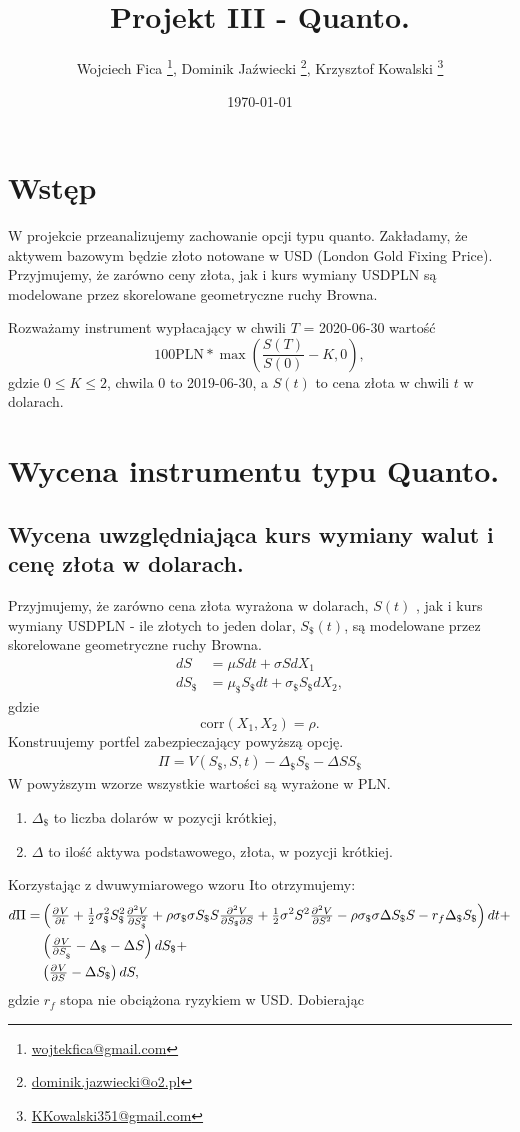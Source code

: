 \documentclass[12pt]{article}
\title{Projekt III - Quanto.}
\author{Wojciech Fica \footnote{\href{mailto:wojtekfica@gmail.com}{wojtekfica@gmail.com}}, Dominik Jaźwiecki \footnote{\href{mailto:dominik.jazwiecki@o2.pl}{dominik.jazwiecki@o2.pl}}, Krzysztof Kowalski \footnote{\href{mailto:KKowalski351@gmail.com}{KKowalski351@gmail.com}}}
\date{\today}
\newcommand{\corr}{\mathrm{corr}}
\providecommand{\pd}[3][]{\ensuremath{
\ifinner
\tfrac{\partial{^{#1}}#2}{\partial{#3^{#1}}}
\else
\dfrac{\partial{^{#1}}#2}{\partial{#3^{#1}}}
\fi
}}
\begin{document}
\maketitle

\section{Wstęp}
\label{Opcja quanto}

W projekcie przeanalizujemy zachowanie opcji typu quanto. Zakładamy, że aktywem bazowym będzie złoto notowane w USD (London Gold Fixing Price). Przyjmujemy, że
zarówno ceny złota, jak i kurs wymiany USDPLN są modelowane przez skorelowane geometryczne ruchy
Browna.

Rozważamy instrument wypłacający w chwili $T$ = 2020-06-30 wartość 
$$ 100 \text{PLN} * \max \left(\frac{S(T)}{S(0)} - K, 0 \right),$$ 
gdzie $0 \leq K \leq 2$, chwila 0 to 2019-06-30, a $S(t)$ to cena złota w chwili $t$ w dolarach.

\section{Wycena instrumentu typu Quanto.}
\subsection{Wycena uwzględniająca kurs wymiany walut i cenę złota w dolarach.}
\label{Wariant 1}

Przyjmujemy, że zarówno cena złota wyrażona w dolarach, $S(t)$ , jak i kurs wymiany USDPLN - ile złotych to jeden dolar, $S_\$(t)$, są modelowane przez skorelowane geometryczne ruchy Browna.
\begin{align*}
dS &= \mu S dt + \sigma S dX_1 \\
dS_\$ &= \mu_\$ S_\$ dt + \sigma_\$ S_\$ dX_2,
\end{align*}
gdzie 
$$
    \corr(X_1, X_2) = \rho.
$$
Konstruujemy portfel zabezpieczający powyższą opcję. 
\begin{align*}
\Pi = V(S_\$, S, t) - \Delta_\$ S_\$ - \Delta S S_\$    
\end{align*}
W powyższym wzorze wszystkie wartości są wyrażone w PLN. 
\begin{enumerate}
    \item $\Delta_\$ $ to liczba dolarów w pozycji krótkiej,
    \item $\Delta$ to ilość aktywa podstawowego, złota, w pozycji krótkiej.
\end{enumerate}
Korzystając z dwuwymiarowego wzoru Ito otrzymujemy:
\begin{align*}
    d\Pi =  &\left( \pd{V}{t} + \tfrac{1}{2} \sigma_\$^2 S_\$^2 \pd[2]{V}{S_\$}  + \rho \sigma_\$ \sigma S_\$ S \tfrac{\partial^2 V}{\partial S_\$\partial S} + \tfrac{1}{2} \sigma^2 S^2 \pd[2]{V}{S} - \rho \sigma_\$ \sigma \Delta S_\$ S - r_f \Delta_\$ S_\$ \right) dt + \\
            &\left( \pd{V}{S_\$} - \Delta_\$ - \Delta S \right) dS_\$ + \\
            &\left( \pd{V}{S} - \Delta S_\$ \right) dS, 
\end{align*}
gdzie $r_f$ stopa nie obciążona ryzykiem w USD.
Dobierając 
\end{document}
